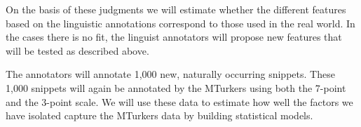 \documentclass[10pt]{article}
\begin{document}
On the basis of these judgments we will estimate whether the different features based on the linguistic annotations correspond to those used in the real world. In the cases there is no fit, the linguist annotators will propose new features that will be tested as described above. 

The annotators will annotate 1,000 new, naturally occurring snippets. These 1,000 snippets will again be annotated by the MTurkers using both the 7-point and the 3-point scale. We will use these data to estimate how well the factors we have isolated capture the MTurkers data by building statistical models.



%
%
%
%
%
%
%
%
\end{document}
